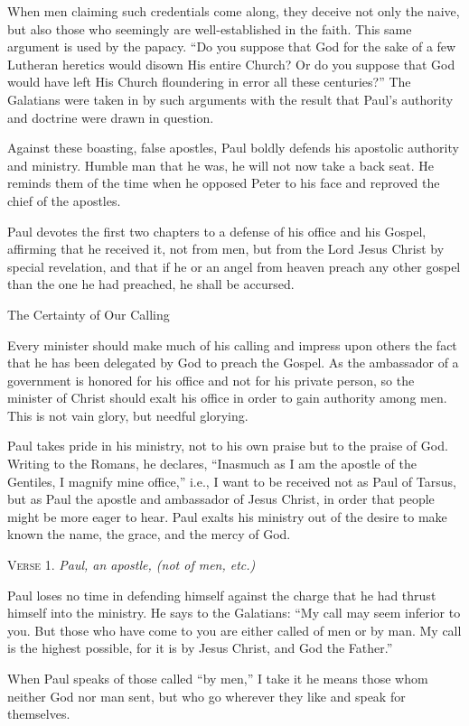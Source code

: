 When men claiming such credentials come along, they deceive not only the naive, but also those who seemingly are well-established in the faith. This same argument is used by the papacy. “Do you suppose that God for the sake of a few Lutheran heretics would disown His entire Church? Or do you suppose that God would have left His Church floundering in error all these centuries?” The Galatians were taken in by such arguments with the result that Paul’s authority and doctrine were drawn in question.

Against these boasting, false apostles, Paul boldly defends his apostolic authority and ministry. Humble man that he was, he will not now take a back seat. He reminds them of the time when he opposed Peter to his face and reproved the chief of the apostles.

Paul devotes the first two chapters to a defense of his office and his Gospel, affirming that he received it, not from men, but from the Lord Jesus Christ by special revelation, and that if he or an angel from heaven preach any other gospel than the one he had preached, he shall be accursed.

The Certainty of Our Calling

Every minister should make much of his calling and impress upon others the fact that he has been delegated by God to preach the Gospel. As the ambassador of a government is honored for his office and not for his private person, so the minister of Christ should exalt his office in order to gain authority among men. This is not vain glory, but needful glorying.

Paul takes pride in his ministry, not to his own praise but to the praise of God. Writing to the Romans, he declares, “Inasmuch as I am the apostle of the Gentiles, I magnify mine office,” i.e., I want to be received not as Paul of Tarsus, but as Paul the apostle and ambassador of Jesus Christ, in order that people might be more eager to hear. Paul exalts his ministry out of the desire to make known the name, the grace, and the mercy of God.

\textsc{Verse} 1. \emph{Paul, an apostle, (not of men, etc.)}

Paul loses no time in defending himself against the charge that he had thrust himself into the ministry. He says to the Galatians: “My call may seem inferior to you. But those who have come to you are either called of men or by man. My call is the highest possible, for it is by Jesus Christ, and God the Father.”

When Paul speaks of those called “by men,” I take it he means those whom neither God nor man sent, but who go wherever they like and speak for themselves.

